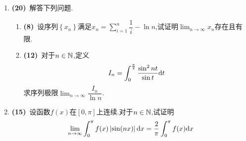 \documentclass{ctexart}
\begin{document}
\begin{enumerate}[leftmargin=*,label=\textbf{\arabic*.},topsep=0pt,parsep=0pt,itemsep=0pt,partopsep=0pt]
    \item \textbf{(20)}\ 解答下列问题.
    \begin{enumerate}[label=\textbf{(\arabic*)}]
        \item \textbf{(8)}\ 设序列$\left\{x_n\right\}$满足$\displaystyle x_n=\sum_{i=1}^n\dfrac{1}{i}-\ln n$,试证明$\displaystyle\lim_{n\to\infty}x_n$存在且有限.
        \item \textbf{(12)}\ 对于$n\in\mathbb{N}$,定义$$I_n=\int_0^\frac{\pi}{2}\dfrac{\sin^2nt}{\sin t}\mathrm{d} t$$求序列极限$\displaystyle\lim_{n\to\infty}\dfrac{I_n}{\ln n}$.
    \end{enumerate}

    \item \textbf{(15)}\ 设函数$f(x)$在$[0,\pi]$上连续.对于$n\in\mathbb{N}$,试证明$$\lim_{n\to\infty}\int_{0}^{\pi}f(x)\left|\sin(nx)\right|\mathrm{d} x=\dfrac{2}{\pi}\int_0^\pi f(x)\mathrm{d} x$$
\end{enumerate}
\end{document}
